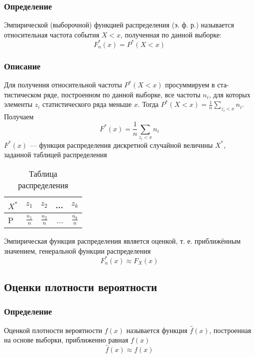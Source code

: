 	\subsubsection{Определение}
	Эмпирической (выборочной) функцией распределения (э. ф. р.) называется
	относительная частота события $X < x$, полученная по данной выборке:
	\begin{equation}
		{F_n^*(x) = P^*(X<x)}
	\end{equation}
	
	
	\subsubsection{Описание}
	Для получения относительной частоты $P^*(X < x)$ просуммируем в ста-
	тистическом ряде, построенном по данной выборке, все частоты $n_i$, для
	которых элементы $z_i$ статистического ряда меньше $x$. Тогда 
	$P^*(X<x)=\frac{1}{n}\sum\limits_{z_i<x}n_i$. Получаем
	\begin{equation}
		{F^*(x)=\frac{1}{n}\sum\limits_{z_i<x}n_i}
	\end{equation}
	$F^*(x)$ — функция распределения дискретной случайной величины $X^*$, заданной таблицей распределения
	\begin{table}[H]
		\centering
		\begin{tabular}[t]{lrrrr}
			\hline
			$X^*$   &      $z_1$ & $z_2$ & ... & $z_k$ 		\\
			\hline
			P & $\frac{n_1}{n}$ & $\frac{n_2}{n}$ & ... & $\frac{n_k}{n}$   	\\
			\hline
		\end{tabular}
		\caption{Таблица распределения}
		\label{tab:normal}
	\end{table}
	Эмпирическая функция распределения является оценкой, т. е. приближённым значением, генеральной функции распределения
	\begin{equation}
		{F_n^*(x)\approx F_X(x)}
	\end{equation}
	
\subsection{Оценки плотности вероятности}
	\subsubsection{Определение}
		Оценкой плотности вероятности $f(x)$ называется функция $\hat{f}(x)$, построенная на основе выборки, приближенно равная $f(x)$
		\begin{equation}
			{\hat{f}(x) \approx f(x)}
		\end{equation}
